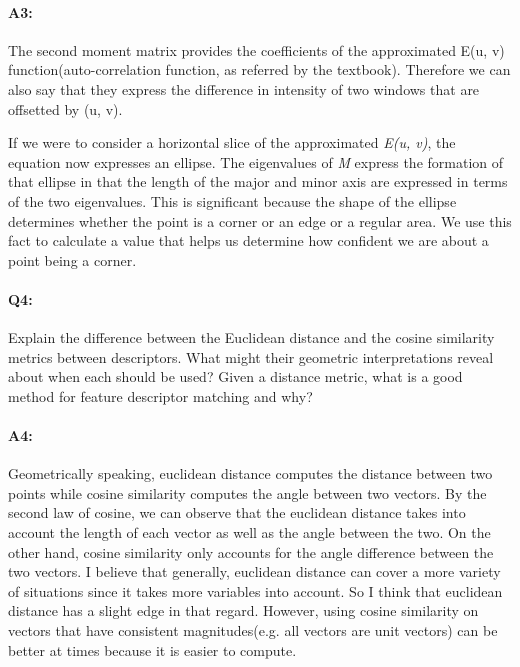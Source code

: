 \paragraph{A3:}
The second moment matrix provides the coefficients of the approximated E(u, v) function(auto-correlation function, as referred by the textbook). Therefore we can also say that they express the difference in intensity of two windows that are offsetted by (u, v).

If we were to consider a horizontal slice of the approximated \emph{E(u, v)}, the equation now expresses an ellipse. The eigenvalues of \emph{M} express the formation of that ellipse in that the length of the major and minor axis are expressed in terms of the two eigenvalues. This is significant because the shape of the ellipse determines whether the point is a corner or an edge or a regular area. We use this fact to calculate a value that helps us determine how confident we are about a point being a corner.



\pagebreak
\paragraph{Q4:} Explain the difference between the Euclidean distance and the cosine similarity metrics between descriptors. What might their geometric interpretations reveal about when each should be used? Given a distance metric, what is a good method for feature descriptor matching and why?

\paragraph{A4:}
Geometrically speaking, euclidean distance computes the distance between two points while cosine similarity computes the angle between two vectors. By the second law of cosine, we can observe that the euclidean distance takes into account the length of each vector as well as the angle between the two. On the other hand, cosine similarity only accounts for the angle difference between the two vectors. I believe that generally, euclidean distance can cover a more variety of situations since it takes more variables into account. So I think that euclidean distance has a slight edge in that regard. However, using cosine similarity on vectors that have consistent magnitudes(e.g. all vectors are unit vectors) can be better at times because it is easier to compute.



